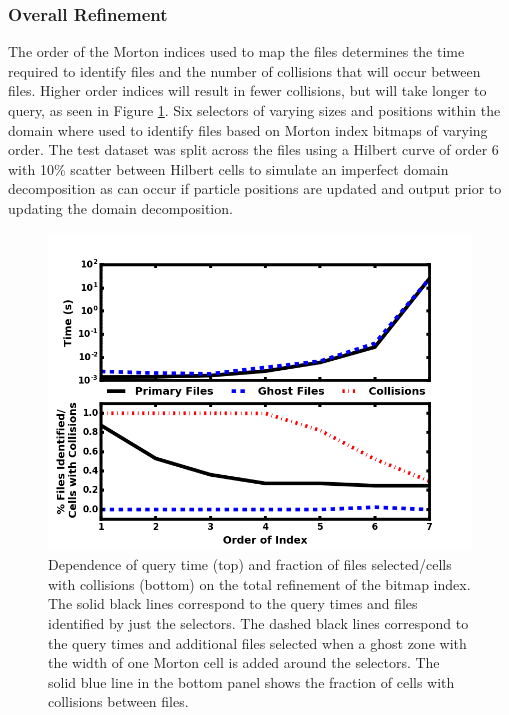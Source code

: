 \documentclass[apjl]{emulateapj}
\begin{document}
\subsubsection{Overall Refinement}\label{SSS:test_order1}
The order of the Morton indices used to map the files determines the time required to identify files and the number of collisions that will occur between files. Higher order indices will result in fewer collisions, but will take longer to query, as seen in Figure \ref{fig:test_order1}. Six selectors of varying sizes and positions within the domain where used to identify files based on Morton index bitmaps of varying order. The test dataset was split across the files using a Hilbert curve of order 6 with 10\% scatter between Hilbert cells to simulate an imperfect domain decomposition as can occur if particle positions are updated and output prior to updating the domain decomposition.
%
\begin{figure}[htbp]
\begin{center}
\includegraphics[width=\columnwidth,keepaspectratio]{../images/vary_order1_np1024_nf512_or0.png}
\caption{Dependence of query time (top) and fraction of files selected/cells with collisions (bottom) on the total refinement of the bitmap index. The solid black lines correspond to the query times and files identified by just the selectors. The dashed black lines correspond to the query times and additional files selected when a ghost zone with the width of one Morton cell is added around the selectors. The solid blue line in the bottom panel shows the fraction of cells with collisions between files.}
\label{fig:test_order1}
\end{center}
\end{figure}
%
\end{document}
